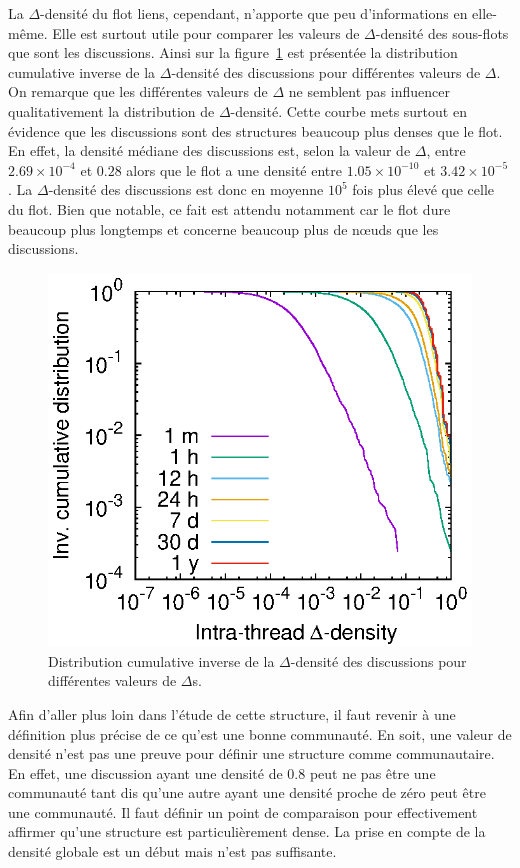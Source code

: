 La $\Delta$-densité du flot liens, cependant, n'apporte que peu d'informations en elle-même.
Elle est surtout utile pour comparer les valeurs de $\Delta$-densité des sous-flots que sont les discussions.
Ainsi sur la figure~\ref{fig:intra_dens_discussion} est présentée la distribution cumulative inverse de la $\Delta$-densité des discussions pour différentes valeurs de $\Delta$.
On remarque que les différentes valeurs de $\Delta$ ne semblent pas influencer qualitativement la distribution de $\Delta$-densité.
Cette courbe mets surtout en évidence que les discussions sont des structures beaucoup plus denses que le flot.
En effet, la densité médiane des discussions est, selon la valeur de $\Delta$, entre $2.69 \times 10^{-4}$ et $0.28$ alors que le flot a une densité entre $1.05  \times 10^{-10}$ et $3.42 \times 10^{-5}$.
La $\Delta$-densité des discussions est donc en moyenne $10^{5}$ fois plus élevé que celle du flot.
Bien que notable, ce fait est attendu notamment car le flot dure beaucoup plus longtemps et concerne beaucoup plus de n\oe uds que les discussions.
\begin{figure}
\centering
	\includegraphics[width=0.48\linewidth]{img/mailing/delta.eps}

\caption{Distribution cumulative inverse de la $\Delta$-densité des discussions pour différentes valeurs de $\Delta$s.}
\label{fig:intra_dens_discussion}
\end{figure}

Afin d'aller plus loin dans l'étude de cette structure, il faut revenir à une définition plus précise de ce qu'est une bonne communauté.
En soit, une valeur de densité n'est pas une preuve pour définir une structure comme communautaire.
En effet, une discussion ayant une densité de $0.8$ peut  ne pas être une communauté tant dis qu'une autre ayant une densité proche de zéro peut être une communauté.
Il faut définir un point de comparaison pour effectivement affirmer qu'une structure est particulièrement dense.
La prise en compte de la densité globale est un début mais n'est pas suffisante.

